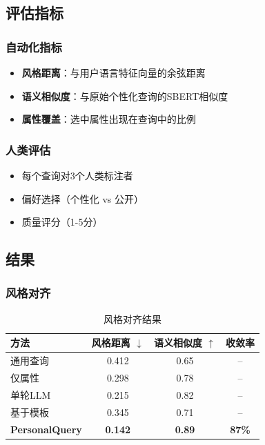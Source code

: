 \documentclass[11pt,a4paper]{article}
\begin{document}
\subsection{评估指标}

\subsubsection{自动化指标}
\begin{itemize}
    \item \textbf{风格距离}：与用户语言特征向量的余弦距离
    \item \textbf{语义相似度}：与原始个性化查询的SBERT相似度
    \item \textbf{属性覆盖}：选中属性出现在查询中的比例
\end{itemize}

\subsubsection{人类评估}
\begin{itemize}
    \item 每个查询对3个人类标注者
    \item 偏好选择（个性化 vs 公开）
    \item 质量评分（1-5分）
\end{itemize}

\subsection{结果}

\subsubsection{风格对齐}

\begin{table}[h]
\centering
\begin{tabular}{lccc}
\toprule
\textbf{方法} & \textbf{风格距离} $\downarrow$ & \textbf{语义相似度} $\uparrow$ & \textbf{收敛率} \\
\midrule
通用查询 & 0.412 & 0.65 & -- \\
仅属性 & 0.298 & 0.78 & -- \\
单轮LLM & 0.215 & 0.82 & -- \\
基于模板 & 0.345 & 0.71 & -- \\
\midrule
\textbf{PersonalQuery} & \textbf{0.142} & \textbf{0.89} & \textbf{87\%} \\
\bottomrule
\end{tabular}
\caption{风格对齐结果}
\label{tab:style}
\end{table}
\end{document}
